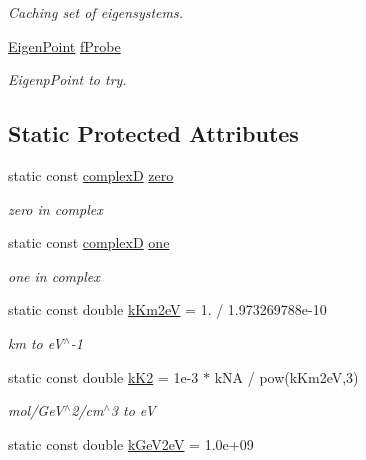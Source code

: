 \begin{DoxyCompactItemize}
\begin{DoxyCompactList}\small\item\em Caching set of eigensystems. \end{DoxyCompactList}\item 
\hyperlink{structOscProb_1_1EigenPoint}{Eigen\+Point} \hyperlink{classOscProb_1_1PMNS__Base_ab1fe4800ee3ae48df4fc942dce00e0d3}{f\+Probe}
\begin{DoxyCompactList}\small\item\em Eigenp\+Point to try. \end{DoxyCompactList}\end{DoxyCompactItemize}
\subsection*{Static Protected Attributes}
\begin{DoxyCompactItemize}
\item 
static const \hyperlink{EigenPoint_8h_a67ca8e107e20610c3fff78d5e726ece0}{complexD} \hyperlink{classOscProb_1_1PMNS__Base_a05e595848c2521dc795efa7645728b94}{zero}
\begin{DoxyCompactList}\small\item\em zero in complex \end{DoxyCompactList}\item 
static const \hyperlink{EigenPoint_8h_a67ca8e107e20610c3fff78d5e726ece0}{complexD} \hyperlink{classOscProb_1_1PMNS__Base_a7d1d0bbcab30a1fd8c368c40134c51ff}{one}
\begin{DoxyCompactList}\small\item\em one in complex \end{DoxyCompactList}\item 
static const double \hyperlink{classOscProb_1_1PMNS__Base_a382ddd7b76ca89b43f22614a2ea7327b}{k\+Km2eV} = 1. / 1.\+973269788e-\/10
\begin{DoxyCompactList}\small\item\em km to e\+V$^\wedge$-\/1 \end{DoxyCompactList}\item 
static const double \hyperlink{classOscProb_1_1PMNS__Base_a326fc5016d7dd7ce05682c06cdcb6d94}{k\+K2} = 1e-\/3 $\ast$ k\+N\+A / pow(k\+Km2e\+V,3)
\begin{DoxyCompactList}\small\item\em mol/\+Ge\+V$^\wedge$2/cm$^\wedge$3 to eV \end{DoxyCompactList}\item 
static const double \hyperlink{classOscProb_1_1PMNS__Base_ad36a0a6bf58d6ec093d3947784bd89e9}{k\+Ge\+V2eV} = 1.\+0e+09

\end{DoxyCompactItemize}
